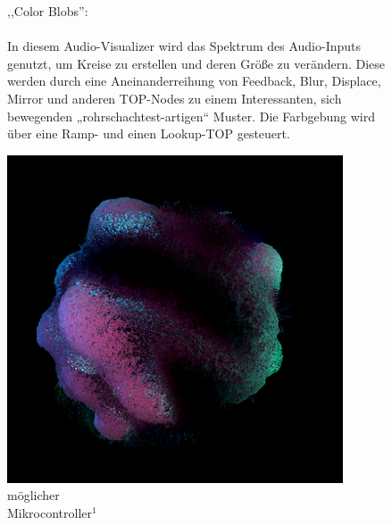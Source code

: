 \documentclass[12pt]{scrartcl}%
\theoremstyle{nonumberplain}
\begin{document}
\begin{figure}[h]
   \begin{minipage}[b]{.4\linewidth}
     ,,Color Blobs'':
     \\\\
In diesem Audio-Visualizer wird das Spektrum des Audio-Inputs genutzt, um Kreise zu erstellen und deren Größe zu verändern. Diese werden durch eine Aneinanderreihung von Feedback, Blur, Displace, Mirror und anderen TOP-Nodes zu einem Interessanten, sich bewegenden „rohrschachtest-artigen“ Muster. Die Farbgebung wird über eine Ramp- und einen Lookup-TOP gesteuert.
   \end{minipage}
   \hspace{.1\linewidth}
   \begin{minipage}[b]{.4\linewidth}
      \includegraphics[width=\linewidth]{sunvox_4}
      \caption{möglicher\\Mikrocontroller${}^{1}$}
   \end{minipage}
\end{figure}
\end{document}
